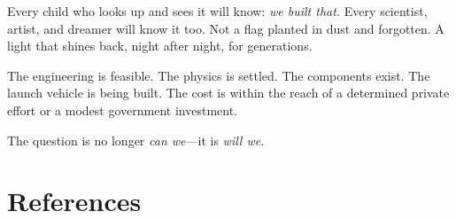 \documentclass[12pt,letterpaper]{article}
\begin{document}
\begin{emeraldquote}
  Every child who looks up and sees it will know: \textit{we built that.}
  Every scientist, artist, and dreamer will know it too. Not a flag planted in
  dust and forgotten. A light that shines back, night after night, for
  generations.
\end{emeraldquote}

The engineering is feasible. The physics is settled. The components exist. The
launch vehicle is being built. The cost is within the reach of a determined
private effort or a modest government investment.

The question is no longer \textit{can we}---it is \textit{will we}.

\section*{References}
\end{document}
